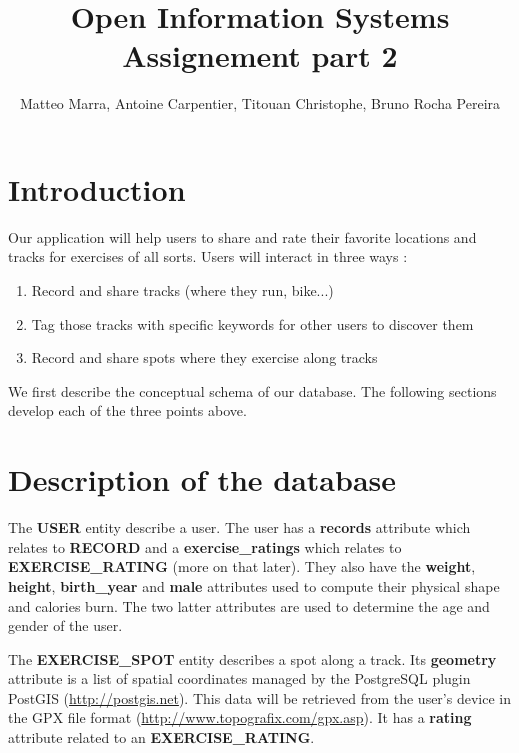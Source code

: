 \documentclass[a4paper]{article}
\title{Open Information Systems\\Assignement part 2 }
\author{Matteo Marra, Antoine Carpentier, Titouan Christophe, Bruno Rocha Pereira}
\begin{document}
\maketitle


\section{Introduction}

Our application will help users to share and rate their favorite locations and tracks for exercises of all sorts. Users will interact in three ways : 

\begin{enumerate}
    \item Record and share tracks (where they run, bike...)
    \item Tag those tracks with specific keywords for other users to discover them
    \item Record and share spots where they exercise along tracks
\end{enumerate}

We first describe the conceptual schema of our database. The following sections develop each of the three points above.

\section{Description of the database}

The \textbf{USER} entity describe a user. The user has a \textbf{records} attribute which relates to \textbf{RECORD} and a \textbf{exercise\_ratings} which relates to \textbf{EXERCISE\_RATING} (more on that later). They also have the \textbf{weight}, \textbf{height}, \textbf{birth\_year} and \textbf{male} attributes used to compute their physical shape and calories burn. The two latter attributes are used to determine the age and gender of the user.

The \textbf{EXERCISE\_SPOT} entity describes a spot along a track. Its \textbf{geometry} attribute is a list of spatial coordinates managed by the PostgreSQL plugin PostGIS (\url{http://postgis.net}). This data will be retrieved from the user's device in the GPX file format (\url{http://www.topografix.com/gpx.asp}). It has a \textbf{rating} attribute related to an \textbf{EXERCISE\_RATING}.
\end{document}
